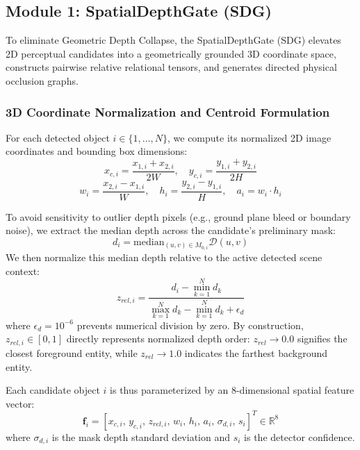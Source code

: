 \documentclass[10pt,twocolumn,letterpaper]{article}
\begin{document}
\subsection{Module 1: SpatialDepthGate (SDG)}
To eliminate Geometric Depth Collapse, the SpatialDepthGate (SDG) elevates 2D perceptual candidates into a geometrically grounded 3D coordinate space, constructs pairwise relative relational tensors, and generates directed physical occlusion graphs.

\subsubsection{3D Coordinate Normalization and Centroid Formulation}
For each detected object $i \in \{1, \dots, N\}$, we compute its normalized 2D image coordinates and bounding box dimensions:
\begin{equation}
x_{c,i} = \frac{x_{1,i} + x_{2,i}}{2W}, \quad y_{c,i} = \frac{y_{1,i} + y_{2,i}}{2H}
\end{equation}
\begin{equation}
w_{i} = \frac{x_{2,i} - x_{1,i}}{W}, \quad h_{i} = \frac{y_{2,i} - y_{1,i}}{H}, \quad a_i = w_i \cdot h_i
\end{equation}

To avoid sensitivity to outlier depth pixels (e.g., ground plane bleed or boundary noise), we extract the median depth across the candidate's preliminary mask:
\begin{equation}
d_i = \mathrm{median}_{(u,v) \in M_{0,i}} \mathcal{D}(u,v)
\end{equation}
We then normalize this median depth relative to the active detected scene context:
\begin{equation}
z_{rel,i} = \frac{d_i - \min_{k=1}^N d_k}{\max_{k=1}^N d_k - \min_{k=1}^N d_k + \epsilon_{d}}
\end{equation}
where $\epsilon_d = 10^{-6}$ prevents numerical division by zero. By construction, $z_{rel,i} \in [0, 1]$ directly represents normalized depth order: $z_{rel} \to 0.0$ signifies the closest foreground entity, while $z_{rel} \to 1.0$ indicates the farthest background entity.

Each candidate object $i$ is thus parameterized by an 8-dimensional spatial feature vector:
\begin{equation}
\mathbf{f}_i = [x_{c,i}, \, y_{c,i}, \, z_{rel,i}, \, w_i, \, h_i, \, a_i, \, \sigma_{d,i}, \, s_i]^T \in \mathbb{R}^8
\end{equation}
where $\sigma_{d,i}$ is the mask depth standard deviation and $s_i$ is the detector confidence.
\end{document}
